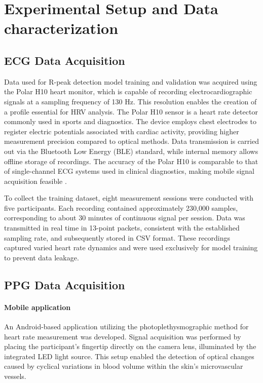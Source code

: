 \documentclass{citask}
\begin{document}
\section{Experimental Setup and Data characterization}

\subsection{ECG Data Acquisition}
Data used for R-peak detection model training and validation was acquired using the Polar H10 heart monitor, which is capable of recording electrocardiographic signals at a sampling frequency of 130 Hz. This resolution enables the creation of a profile essential for HRV analysis. The Polar H10 sensor is a heart rate detector commonly used in sports and diagnostics. The device employs chest electrodes to register electric potentials associated with cardiac activity, providing higher measurement precision compared to optical methods. Data transmission is carried out via the Bluetooth Low Energy (BLE) standard, while internal memory allows offline storage of recordings. The accuracy of the Polar H10 is comparable to that of single-channel ECG systems used in clinical diagnostics, making mobile signal acquisition feasible \cite{21}.

To collect the training dataset, eight measurement sessions were conducted with five participants. Each recording contained approximately 230,000 samples, corresponding to about 30 minutes of continuous signal per session. Data was transmitted in real time in 13-point packets, consistent with the established sampling rate, and subsequently stored in CSV format. These recordings captured varied heart rate dynamics and were used exclusively for model training to prevent data leakage.

\subsection{PPG Data Acquisition}
\paragraph{Mobile application}
An Android-based application utilizing the photoplethysmographic method for heart rate measurement was developed. Signal acquisition was performed by placing the participant’s fingertip directly on the camera lens, illuminated by the integrated LED light source. This setup enabled the detection of optical changes caused by cyclical variations in blood volume within the skin’s microvascular vessels. 
\end{document}
